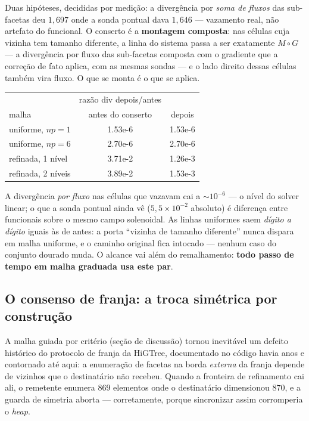 Duas hipóteses, decididas por medição: a divergência por \emph{soma de fluxos}
das sub-facetas deu $1{,}697$ onde a sonda pontual dava $1{,}646$ ---
vazamento real, não artefato do funcional. O conserto é a \textbf{montagem
composta}: nas células cuja vizinha tem tamanho diferente, a linha do sistema
passa a ser exatamente $M \circ G$ --- a divergência por fluxo das sub-facetas
composta com o gradiente que a correção de fato aplica, com as mesmas sondas
--- e o lado direito dessas células também vira fluxo. O que se monta é o que
se aplica.

\begin{center}
\begin{tabular}{lSS}
  \toprule
  & {razão div depois/antes} & {} \\
  malha & {antes do conserto} & {depois} \\
  \midrule
  uniforme, $np=1$      & 1.53e-6 & 1.53e-6 \\
  uniforme, $np=6$      & 2.70e-6 & 2.70e-6 \\
  refinada, 1 nível     & 3.71e-2 & 1.26e-3 \\
  refinada, 2 níveis    & 3.89e-2 & 1.53e-3 \\
  \bottomrule
\end{tabular}
\end{center}

A divergência \emph{por fluxo} nas células que vazavam cai a ${\sim}10^{-6}$
--- o nível do solver linear; o que a sonda pontual ainda vê ($5{,}5 \times
10^{-2}$ absoluto) é diferença entre funcionais sobre o mesmo campo solenoidal.
As linhas uniformes saem \emph{dígito a dígito} iguais às de antes: a porta
``vizinha de tamanho diferente'' nunca dispara em malha uniforme, e o caminho
original fica intocado --- nenhum caso do conjunto dourado muda. O alcance vai
além do remalhamento: \textbf{todo passo de tempo em malha graduada usa este
par}.

\subsection{O consenso de franja: a troca simétrica por construção}

A malha guiada por critério (seção de discussão) tornou inevitável um defeito
histórico do protocolo de franja da HiGTree, documentado no código havia anos e
contornado até aqui: a enumeração de facetas na borda \emph{externa} da franja
depende de vizinhos que o destinatário não recebeu. Quando a fronteira de
refinamento cai ali, o remetente enumera $869$ elementos onde o destinatário
dimensionou $870$, e a guarda de simetria aborta --- corretamente, porque
sincronizar assim corromperia o \emph{heap}.

